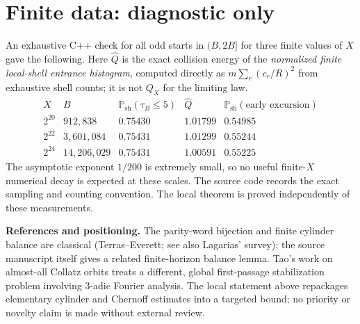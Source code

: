 \documentclass[11pt]{amsart}
\theoremstyle{remark}\newtheorem{remark}{Remark}
\newcommand{\Psh}{\mathbb P_{\mathrm{sh}}}
\begin{document}
\section{Finite data: diagnostic only}
An exhaustive C++ check for all odd starts in $(B,2B]$ for three finite values of $X$ gave the following.  Here $\widehat Q$ is the exact collision energy of the \emph{normalized finite local-shell entrance histogram}, computed directly as $m\sum_r(c_r/R)^2$ from exhaustive shell counts; it is not $Q_X$ for the limiting law.
\[
\begin{array}{c|r|r|r|r}
X & B & \Psh(\tau_B\le5) & \widehat Q & \Psh(\text{early excursion})\\\hline
2^{20} & 912{,}838 &0.75430&1.01799&0.54985\\
2^{22} &3{,}601{,}084&0.75431&1.01299&0.55244\\
2^{24} &14{,}206{,}029&0.75431&1.00591&0.55225
\end{array}
\]
The asymptotic exponent $1/200$ is extremely small, so no useful finite-$X$ numerical decay is expected at these scales.  The source code records the exact sampling and counting convention.  The local theorem is proved independently of these measurements.

\noindent\textbf{References and positioning.} The parity-word bijection and finite cylinder balance are classical (Terras--Everett; see also Lagarias' survey); the source manuscript itself gives a related finite-horizon balance lemma.  Tao's work on almost-all Collatz orbits treats a different, global first-passage stabilization problem involving $3$-adic Fourier analysis.  The local statement above repackages elementary cylinder and Chernoff estimates into a targeted bound; no priority or novelty claim is made without external review.
\end{document}
